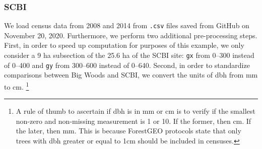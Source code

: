 \documentclass[12pt]{article}
\newenvironment{Shaded}{\begin{snugshade}}{\end{snugshade}}
\newcommand{\DataTypeTok}[1]{\textcolor[rgb]{0.13,0.29,0.53}{#1}}
\newcommand{\DecValTok}[1]{\textcolor[rgb]{0.00,0.00,0.81}{#1}}
\newcommand{\KeywordTok}[1]{\textcolor[rgb]{0.13,0.29,0.53}{\textbf{#1}}}
\newcommand{\NormalTok}[1]{#1}
\newcommand{\OperatorTok}[1]{\textcolor[rgb]{0.81,0.36,0.00}{\textbf{#1}}}
\newcommand{\StringTok}[1]{\textcolor[rgb]{0.31,0.60,0.02}{#1}}
\begin{document}
\hypertarget{scbi-data}{%
\subsubsection{SCBI}\label{scbi-data}}

We load census data from 2008 and 2014 from \texttt{.csv} files saved
from GitHub on November 20, 2020. Furthermore, we perform two additional
pre-processing steps. First, in order to speed up computation for
purposes of this example, we only consider a 9 ha subsection of the 25.6
ha of the SCBI site: \texttt{gx} from 0--300 instead of 0--400 and
\texttt{gy} from 300--600 instead of 0--640. Second, in order to
standardize comparisons between Big Woods and SCBI, we convert the units
of dbh from mm to cm. \footnote{A rule of thumb to ascertain if dbh is
  in mm or cm is to verify if the smallest non-zero and non-missing
  measurement is 1 or 10. If the former, then cm. If the later, then mm.
  This is because ForestGEO protocols state that only trees with dbh
  greater or equal to 1cm should be included in censuses. }

\begin{Shaded}
\end{Shaded}
\end{document}
